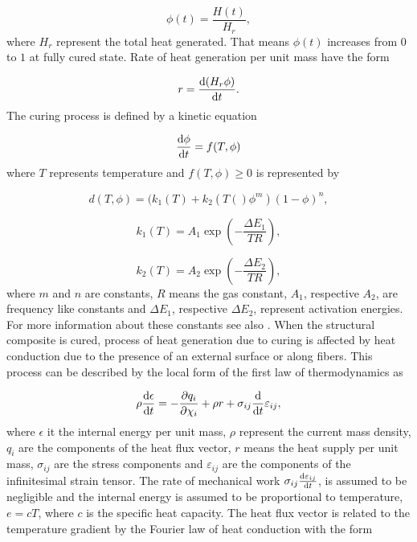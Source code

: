 \begin{equation}
	\phi(t) = \dfrac{H(t)}{H_r},
\end{equation}
where $H_r$ represent the total heat generated. That means $\phi(t)$ increases from $0$ to $1$ at fully cured state. Rate of heat generation per unit mass have the form

\begin{equation}
	r = \dv{(H_r\phi)}{t}.
\end{equation}
The curing process is defined by a kinetic equation 

\begin{equation}\label{eq:curing_process}
	\dv{\phi}{t} = f(T,\phi)
\end{equation}
where $T$ represents temperature and $f(T,\phi)\geq 0$ is represented by 

\begin{equation}\label{eq:temperature_function}
	d(T,\phi) = (k_1(T)+k_2(T()\phi^m)(1-\phi)^n,
\end{equation}

\begin{equation}
	k_1(T) = A_1 \exp \left(-\dfrac{\Delta E_1}{TR}\right),
\end{equation}

\begin{equation}
	k_2(T) = A_2 \exp \left( -\dfrac{\Delta E_2}{TR}\right),
\end{equation}
where $m$ and $n$ are constants, $R$ means the gas constant, $A_1$, respective $A_2$, are frequency like constants and $\Delta E_1$, respective $\Delta E_2$, represent activation energies. For more information about these constants see also \cite{heinrich2012generation}.
When the structural composite is cured, process of heat generation due to curing is affected by heat conduction due to the presence of an external surface or along fibers. This process can be described by the local form of the first law of thermodynamics as

\begin{equation} \label{eq:heat_conduct}
	\rho \dv{\epsilon}{t} = - \pdv{q_i}{\chi_i} + \rho r + \sigma_{ij} \dv{t}\varepsilon_{ij},
\end{equation}
where $\epsilon$ it the internal energy per unit mass, $\rho$ represent the current mass density, $q_i$ are the components of the heat flux vector, $r$ means the heat supply per unit mass, $\sigma_{ij}$ are the stress components and $\varepsilon_{ij}$ are the components of the infinitesimal strain tensor. 
The rate of mechanical work $\sigma_{ij}\dv{\varepsilon_{ij}}{t} $, is assumed to be negligible and the internal energy is assumed to be proportional to temperature, $e=cT$, where $c$ is the specific heat capacity. The heat flux vector is related to the temperature gradient by the Fourier law of heat conduction with the form

